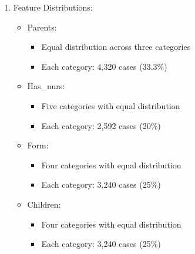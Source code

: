 \begin{enumerate}
    \item Feature Distributions:
    \begin{itemize}
        \item Parents:
            \begin{itemize}
                \item Equal distribution across three categories
                \item Each category: 4,320 cases (33.3\%)
            \end{itemize}
        \item Has\_nurs:
            \begin{itemize}
                \item Five categories with equal distribution
                \item Each category: 2,592 cases (20\%)
            \end{itemize}
        \item Form:
            \begin{itemize}
                \item Four categories with equal distribution
                \item Each category: 3,240 cases (25\%)
            \end{itemize}
        \item Children:
            \begin{itemize}
                \item Four categories with equal distribution
                \item Each category: 3,240 cases (25\%)
            \end{itemize}
    \end{itemize}
\end{enumerate}

